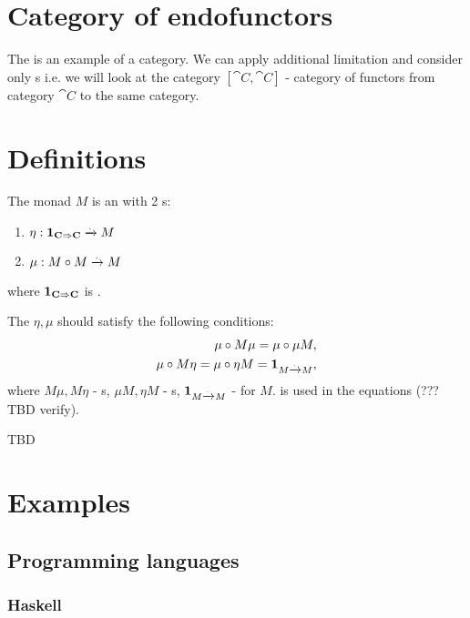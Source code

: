 \section{Category of endofunctors}

The  is an example of a category. We can
apply additional limitation and consider only
s i.e. we will look at the category
$[\cat{C}, \cat{C}]$ - category of functors from category $\cat{C}$ to
the same category.


\section{Definitions}

\begin{definition}[Monad]
  \label{def:monad}
  The monad $M$ is an  with 2
  s:
  \begin{enumerate}
  \item $\eta: \mathbf{1}_{ \mathbf{C} \Rightarrow \mathbf{C} } \xrightarrow{.} M$
  \item $\mu: M \circ M \xrightarrow{.} M$
  \end{enumerate}
  where $\mathbf{1}_{ \mathbf{C} \Rightarrow \mathbf{C} }$ is .

  The $\eta, \mu$ should satisfy the following conditions:
  \begin{eqnarray}
    \mu \circ M \mu = \mu \circ \mu M, 
    \nonumber \\
    \mu \circ M \eta = \mu \circ \eta M = \mathbf{1}_{ M \xrightarrow{.} M },
    \nonumber
  \end{eqnarray}
  where $M \mu, M \eta$ - s, $\mu M, \eta M$ -
  s, $\mathbf{1}_{ M \xrightarrow{.} M }$ -  for $M$.
   is used in the equations
  (???TBD verify).
\end{definition}

TBD

\section{Examples}

\subsection{Programming languages}

\subsubsection{Haskell}

